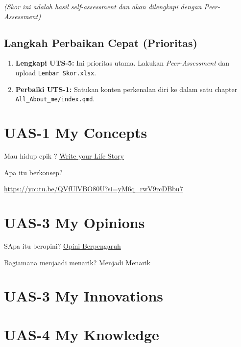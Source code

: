 \documentclass[
  letterpaper,
  DIV=11,
  numbers=noendperiod]{scrreprt}
\providecommand{\tightlist}{%
  \setlength{\itemsep}{0pt}\setlength{\parskip}{0pt}}
\begin{document}
\emph{(Skor ini adalah hasil self-assessment dan akan dilengkapi dengan
Peer-Assessment)}

\section{Langkah Perbaikan Cepat
(Prioritas)}\label{langkah-perbaikan-cepat-prioritas}

\begin{enumerate}
\def\labelenumi{\arabic{enumi}.}
\tightlist
\item
  \textbf{Lengkapi UTS-5:} Ini prioritas utama. Lakukan
  \emph{Peer-Assessment} dan upload \texttt{Lembar\ Skor.xlsx}.
\item
  \textbf{Perbaiki UTS-1:} Satukan konten perkenalan diri ke dalam satu
  chapter \texttt{All\_About\_me/index.qmd}.
\end{enumerate}


\chapter{UAS-1 My Concepts}\label{uas-1-my-concepts}

Mau hidup epik ? \href{lifestory.pdf}{Write your Life Story}

Apa itu berkonsep?

\url{https://youtu.be/QVfUlVBO80U?si=yM6q_rwV9rcDBbu7}


\chapter{UAS-3 My Opinions}\label{uas-3-my-opinions}

SApa itu beropini? \href{BM\%20Opini.mp4}{Opini Berpengaruh}

Bagiamana menjaadi menarik? \href{./Interesting.mp4}{Menjadi Menarik}


\chapter{UAS-3 My Innovations}\label{uas-3-my-innovations}


\chapter{UAS-4 My Knowledge}\label{uas-4-my-knowledge}
\end{document}
